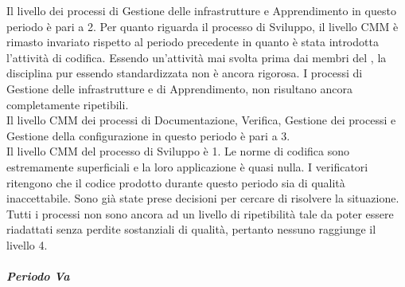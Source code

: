 Il livello  dei processi di Gestione delle infrastrutture e Apprendimento in questo periodo è pari a 2.
Per quanto riguarda il processo di Sviluppo, il livello CMM è rimasto invariato rispetto al periodo precedente in quanto è stata introdotta l'attività di codifica. Essendo un'attività mai svolta prima dai membri del , la disciplina pur essendo standardizzata non è ancora rigorosa.
I processi di Gestione delle infrastrutture e di Apprendimento, non risultano ancora completamente ripetibili.\\
Il livello CMM dei processi di Documentazione, Verifica, Gestione dei processi e Gestione della configurazione in questo periodo è pari a 3.\\
Il livello CMM del processo di Sviluppo è 1. Le norme di codifica sono estremamente superficiali e la loro applicazione è quasi nulla. I verificatori ritengono che il codice prodotto durante questo periodo sia di qualità inaccettabile. Sono già state prese decisioni per cercare di risolvere la situazione.\\
Tutti i processi non sono ancora ad un livello di ripetibilità tale da poter essere riadattati senza perdite sostanziali di qualità, pertanto nessuno raggiunge il livello 4.

\subparagraph{Periodo Va}


